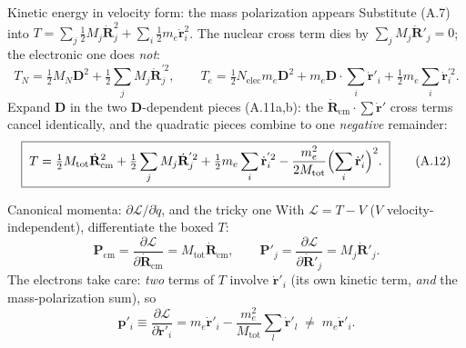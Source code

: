 \documentclass[aspectratio=169,10pt]{beamer}
\newcommand{\stagenum}{0}
\newcommand{\setstage}[1]{\renewcommand{\stagenum}{#1}}
\begin{document}
\begin{frame}{Kinetic energy in velocity form: the mass polarization appears}
\setstage{1}
Substitute (A.7) into $T=\sum_j\tfrac12M_j\dot{\mathbf R}_j^2+\sum_i\tfrac12m_e\dot{\mathbf r}_i^2$. The nuclear cross term dies by $\sum_jM_j\dot{\mathbf R}'_j=0$; the electronic one does \emph{not}:
\begin{equation*}
T_N=\tfrac12M_N\mathbf D^2+\tfrac12\sum_jM_j\dot{\mathbf R}_j^{'2}, \qquad
T_e=\tfrac12N_{\mathrm{elec}}m_e\mathbf D^2+m_e\mathbf D\!\cdot\!\sum_i\dot{\mathbf r}'_i+\tfrac12m_e\sum_i\dot{\mathbf r}_i^{'2}. \tag{A.8, A.9}
\end{equation*}
\pause
Expand $\mathbf D$ in the two $\mathbf D$-dependent pieces (A.11a,b): the $\dot{\mathbf R}_{\mathrm{cm}}\!\cdot\!\sum\dot{\mathbf r}'$ cross terms cancel \alert{identically}, and the quadratic pieces combine to one \emph{negative} remainder:
\begin{equation*}
\boxed{\;T = \tfrac12 M_{\mathrm{tot}}\dot{\mathbf R}_{\mathrm{cm}}^{2}
+ \tfrac12\sum_j M_j\dot{\mathbf R}_j^{'2}
+ \tfrac12 m_e\sum_i\dot{\mathbf r}_i^{'2}
- \frac{m_e^2}{2M_{\mathrm{tot}}}\Bigl(\sum_i\dot{\mathbf r}'_i\Bigr)^{2}.\;} \tag{A.12}
\end{equation*}
\end{frame}

\begin{frame}{Canonical momenta: $\partial \mathcal L/\partial\dot q$, and the tricky one}
\setstage{1}
With $\mathcal L=T-V$ ($V$ velocity-independent), differentiate the boxed $T$:
\begin{equation*}
\mathbf P_{\mathrm{cm}} = \frac{\partial \mathcal L}{\partial\dot{\mathbf R}_{\mathrm{cm}}} = M_{\mathrm{tot}}\dot{\mathbf R}_{\mathrm{cm}},
\qquad
\mathbf P'_j = \frac{\partial \mathcal L}{\partial\dot{\mathbf R}'_j} = M_j\dot{\mathbf R}'_j . \tag{A.13, A.17}
\end{equation*}
The electrons take care: \emph{two} terms of $T$ involve $\dot{\mathbf r}'_i$ (its own kinetic term, \emph{and} the mass-polarization sum), so
\begin{equation*}
\boxed{\;\mathbf p'_i \equiv \frac{\partial \mathcal L}{\partial\dot{\mathbf r}'_i}
= m_e\dot{\mathbf r}'_i - \frac{m_e^2}{M_{\mathrm{tot}}}\sum_l\dot{\mathbf r}'_l
\;\ne\; m_e\dot{\mathbf r}'_i .\;} \tag{A.14}
\end{equation*}
\end{frame}
\end{document}
